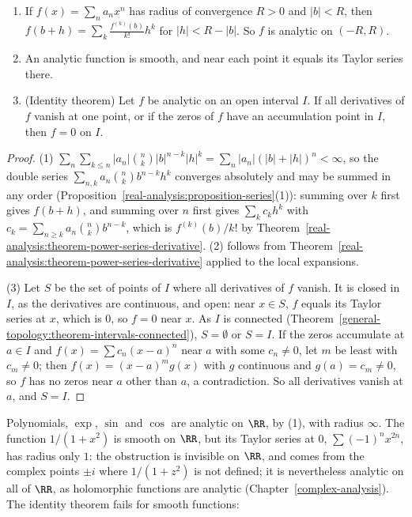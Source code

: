 \begin{proposition}\label{real-analysis:proposition-analytic}
\begin{enumerate}
\item If $f(x) = \sum_na_nx^n$ has radius of convergence $R > 0$ and $|b| < R$, then $f(b + h) = \sum_k\frac{f^{(k)}(b)}{k!}h^k$ for $|h| < R - |b|$. So $f$ is analytic on $(-R, R)$.
\item An analytic function is smooth, and near each point it equals its Taylor series there.
\item (Identity theorem) Let $f$ be analytic on an open interval $I$. If all derivatives of $f$ vanish at one point, or if the zeros of $f$ have an accumulation point in $I$, then $f = 0$ on $I$.
\end{enumerate}
\end{proposition}

\begin{proof}
(1) $\sum_n\sum_{k \leq n}|a_n|\binom nk|b|^{n-k}|h|^k = \sum_n|a_n|(|b| + |h|)^n < \infty$, so the double series $\sum_{n,k}a_n\binom nkb^{n-k}h^k$ converges absolutely and may be summed in any order
(Proposition~\ref{real-analysis:proposition-series}(1)): summing over $k$ first gives $f(b + h)$, and summing over $n$ first gives $\sum_kc_kh^k$ with $c_k = \sum_{n \geq k}a_n\binom nkb^{n-k}$, which is
$f^{(k)}(b)/k!$ by Theorem~\ref{real-analysis:theorem-power-series-derivative}. (2) follows from Theorem~\ref{real-analysis:theorem-power-series-derivative} applied to the local expansions.

(3) Let $S$ be the set of points of $I$ where all derivatives of $f$ vanish. It is closed in $I$, as the derivatives are continuous, and open: near $x \in S$, $f$ equals its Taylor series at $x$, which is
$0$, so $f = 0$ near $x$. As $I$ is connected (Theorem~\ref{general-topology:theorem-intervals-connected}), $S = \emptyset$ or $S = I$. If the zeros accumulate at $a \in I$ and $f(x) = \sum c_n(x - a)^n$
near $a$ with some $c_n \neq 0$, let $m$ be least with $c_m \neq 0$; then $f(x) = (x - a)^mg(x)$ with $g$ continuous and $g(a) = c_m \neq 0$, so $f$ has no zeros near $a$ other than $a$, a contradiction.
So all derivatives vanish at $a$, and $S = I$.
\end{proof}

Polynomials, $\exp$, $\sin$ and $\cos$ are analytic on $\RR$, by (1), with radius $\infty$. The function $1/(1 + x^2)$ is smooth on $\RR$, but its Taylor series at $0$, $\sum(-1)^nx^{2n}$, has radius only
$1$: the obstruction is invisible on $\RR$, and comes from the complex points $\pm i$ where $1/(1 + z^2)$ is not defined; it is nevertheless analytic on all of $\RR$, as holomorphic functions are analytic
(Chapter~\ref{complex-analysis}). The identity theorem fails for smooth functions:

